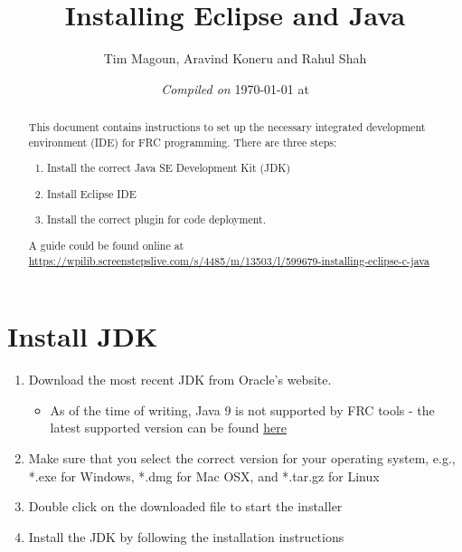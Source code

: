 \documentclass[11pt,fleqn]{article}
\begin{document}
\title{Installing Eclipse and Java}
\author{Tim Magoun, Aravind Koneru and Rahul Shah}
\date{\textit{Compiled on} \today \hspace{1mm} at \currenttime}
\maketitle

\begin{abstract}
This document contains instructions to set up the necessary integrated development environment (IDE) for FRC programming. There are three steps:
\begin{enumerate}
\item Install the correct Java SE Development Kit (JDK)
\item Install Eclipse IDE
\item Install the correct plugin for code deployment.
\end{enumerate}
A guide could be found online at \url{https://wpilib.screenstepslive.com/s/4485/m/13503/l/599679-installing-eclipse-c-java}
\end{abstract}

\section*{Install JDK}
\begin{enumerate}
\item Download the most recent JDK from Oracle's website.
  \begin{itemize}
      \item As of the time of writing, Java 9 is not supported by FRC tools - the latest supported version can be found \href{http://www.oracle.com/technetwork/java/javase/downloads/jdk8-downloads-2133151.html}{here}
  \end{itemize}

\item Make sure that you select the correct version for your operating system, e.g., *.exe for Windows, *.dmg for Mac OSX, and *.tar.gz for Linux

\item Double click on the downloaded file to start the installer

\item Install the JDK by following the installation instructions
\end{enumerate}
\end{document}
